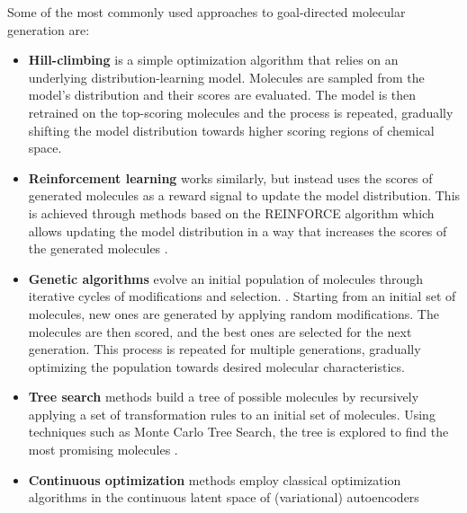 Some of the most commonly used approaches to goal-directed molecular generation are:
\begin{itemize}
    \item \textbf{Hill-climbing}
          \citep{seglerGeneratingFocusedMolecule2018,xieMARSMarkovMolecular2020,thomasAugmentedHillClimbIncreases2022}
          is a simple optimization algorithm that relies on an underlying distribution-learning model.
          Molecules are sampled from the model's distribution and their scores are evaluated.
          The model is then retrained on the top-scoring molecules and the process is repeated,
          gradually shifting the model distribution towards higher scoring regions of chemical space.
    \item \textbf{Reinforcement learning} works similarly, but instead uses the scores of
          generated molecules as a reward signal to update the model distribution. This is
          achieved through methods based on the REINFORCE algorithm
          \citep{williamsSimpleStatisticalGradientfollowing1992} which allows updating the model
          distribution in a way that increases the scores of the generated molecules
          \citep{olivecronaMolecularDenovoDesign2017,thomasAugmentedHillClimbIncreases2022,youGraphConvolutionalPolicy2018,guoAugmentedMemorySampleEfficient2024}.
    \item \textbf{Genetic algorithms} evolve an initial population of molecules through iterative
          cycles of modifications and selection.
          \citep{jensenGraphbasedGeneticAlgorithm2019,nigamGenerativeModelsSuperfast2021,yoshikawaPopulationbasedNovoMolecule2018}.
          Starting from an initial set of molecules, new ones are generated by applying random
          modifications. The molecules are then scored, and the best ones are selected for the next
          generation. This process is repeated for multiple generations, gradually optimizing the
          population towards desired molecular characteristics.
    \item \textbf{Tree search} methods build a tree of possible molecules by recursively applying a set of transformation rules
          to an initial set of molecules. Using techniques such as Monte Carlo Tree Search, the tree is
          explored to find the most promising molecules \citep{yangChemTSEfficientPython2017,jensenGraphbasedGeneticAlgorithm2019}.
    \item \textbf{Continuous optimization} methods employ classical optimization algorithms in the
          continuous latent space of (variational) autoencoders

\end{itemize}
